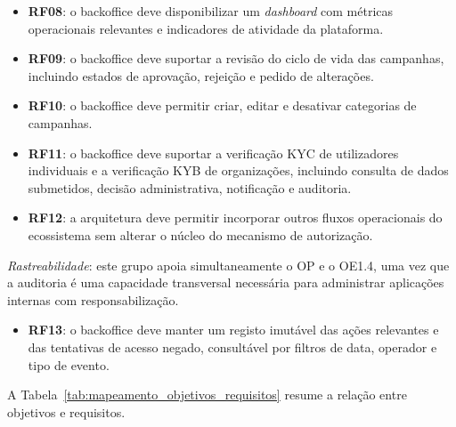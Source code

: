 \begin{itemize}
  \item \textbf{RF08}: o backoffice deve disponibilizar um \textit{dashboard} com métricas operacionais relevantes e indicadores de atividade da plataforma.
  \item \textbf{RF09}: o backoffice deve suportar a revisão do ciclo de vida das campanhas, incluindo estados de aprovação, rejeição e pedido de alterações.
  \item \textbf{RF10}: o backoffice deve permitir criar, editar e desativar categorias de campanhas.
  \item \textbf{RF11}: o backoffice deve suportar a verificação \gls{KYC} de utilizadores individuais e a verificação \gls{KYB} de organizações, incluindo consulta de dados submetidos, decisão administrativa, notificação e auditoria.
  \item \textbf{RF12}: a arquitetura deve permitir incorporar outros fluxos operacionais do ecossistema sem alterar o núcleo do mecanismo de autorização.
\end{itemize}

\medskip\noindent\textit{Rastreabilidade}: este grupo apoia simultaneamente o OP e o OE1.4, uma vez que a auditoria é uma capacidade transversal necessária para administrar aplicações internas com responsabilização.

\begin{itemize}
  \item \textbf{RF13}: o backoffice deve manter um registo imutável das ações relevantes e das tentativas de acesso negado, consultável por filtros de data, operador e tipo de evento.
\end{itemize}

A Tabela~\ref{tab:mapeamento_objetivos_requisitos} resume a relação entre objetivos e requisitos.

